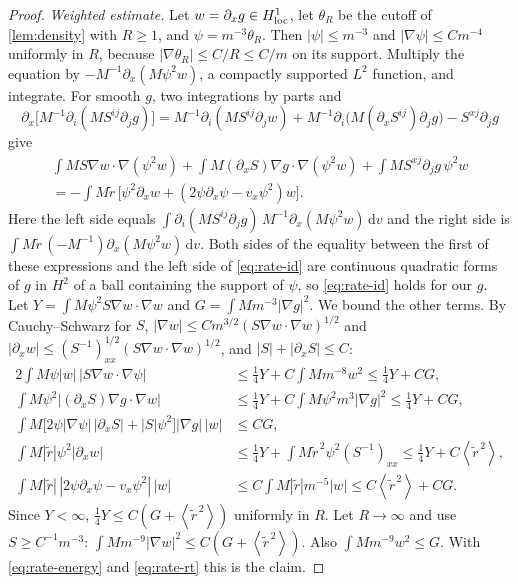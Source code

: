 \documentclass[11pt]{article}
\newcommand{\dd}{\,\mathrm d}
\newcommand{\av}[1]{\left\langle #1\right\rangle}
\theoremstyle{definition}
\theoremstyle{remark}
\numberwithin{equation}{section}
\begin{document}
\begin{proof}
\emph{Weighted estimate.} Let $w=\partial_xg\in H^1_{\rm loc}$, let
$\theta_R$ be the cutoff of \cref{lem:density} with $R\geq1$, and
$\psi=m^{-3}\theta_R$. Then $|\psi|\leq m^{-3}$ and
$|\nabla\psi|\leq Cm^{-4}$ uniformly in $R$, because
$|\nabla\theta_R|\leq C/R\leq C/m$ on its support. Multiply the equation by
$-M^{-1}\partial_x(M\psi^2w)$, a compactly supported $L^2$ function, and
integrate. For smooth $g$, two integrations by parts and
\[
 \partial_x\bigl[M^{-1}\partial_i(MS^{ij}\partial_jg)\bigr]
 =M^{-1}\partial_i(MS^{ij}\partial_jw)
  +M^{-1}\partial_i\bigl(M(\partial_xS^{ij})\partial_jg\bigr)
  -S^{xj}\partial_jg
\]
give
\begin{multline}
 \int MS\nabla w\cdot\nabla(\psi^2w)
  +\int M(\partial_xS)\nabla g\cdot\nabla(\psi^2w)
  +\int MS^{xj}\partial_jg\,\psi^2w\\
 =-\int M\widetilde r\,\bigl[\psi^2\partial_xw
    +(2\psi\partial_x\psi-v_x\psi^2)w\bigr].
 \label{eq:rate-id}
\end{multline}
Here the left side equals
$\int\partial_i(MS^{ij}\partial_jg)\,M^{-1}\partial_x(M\psi^2w)\dd v$ and
the right side is $\int M\widetilde r\,(-M^{-1})\partial_x(M\psi^2w)\dd v$.
Both sides of the equality between the first of these expressions and the
left side of \eqref{eq:rate-id} are continuous quadratic forms of $g$ in
$H^2$ of a ball containing the support of $\psi$, so
\eqref{eq:rate-id} holds for our $g$. Let
$Y=\int M\psi^2S\nabla w\cdot\nabla w$ and
$G=\int Mm^{-3}|\nabla g|^2$. We bound the other terms. By
Cauchy--Schwarz for $S$, $|\nabla w|\leq Cm^{3/2}(S\nabla w\cdot\nabla
w)^{1/2}$ and $|\partial_xw|\leq(S^{-1})_{xx}^{1/2}(S\nabla w\cdot\nabla
w)^{1/2}$, and $|S|+|\partial_xS|\leq C$:
\begin{align*}
 2\!\int M\psi|w|\,|S\nabla w\cdot\nabla\psi|
  &\leq\tfrac14Y+C\!\int Mm^{-8}w^2\leq\tfrac14Y+CG,\\
 \int M\psi^2|(\partial_xS)\nabla g\cdot\nabla w|
  &\leq\tfrac14Y+C\!\int M\psi^2m^3|\nabla g|^2\leq\tfrac14Y+CG,\\
 \int M\bigl[2\psi|\nabla\psi|\,|\partial_xS|+|S|\psi^2\bigr]|\nabla g|\,|w|
  &\leq CG,\\
 \int M|\widetilde r|\psi^2|\partial_xw|
  &\leq\tfrac14Y+\int M\widetilde r^{\,2}\psi^2(S^{-1})_{xx}
   \leq\tfrac14Y+C\av{\widetilde r^{\,2}},\\
 \int M|\widetilde r|\,|2\psi\partial_x\psi-v_x\psi^2|\,|w|
  &\leq C\!\int M|\widetilde r|m^{-5}|w|\leq C\av{\widetilde r^{\,2}}+CG .
\end{align*}
Since $Y<\infty$, $\tfrac14Y\leq C(G+\av{\widetilde r^{\,2}})$ uniformly in
$R$. Let $R\to\infty$ and use $S\geq C^{-1}m^{-3}$:
$\int Mm^{-9}|\nabla w|^2\leq C(G+\av{\widetilde r^{\,2}})$. Also
$\int Mm^{-9}w^2\leq G$. With \eqref{eq:rate-energy} and
\eqref{eq:rate-rt} this is the claim.
\end{proof}
\end{document}
